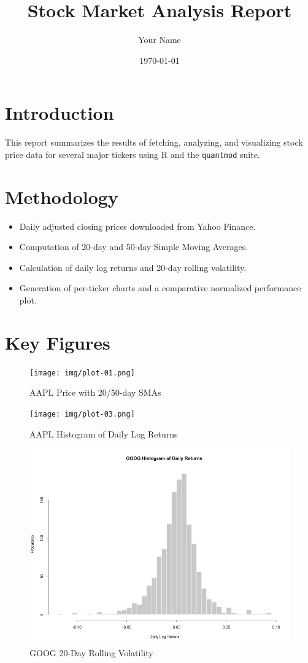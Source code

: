 \documentclass[11pt]{article}
\title{Stock Market Analysis Report}
\author{Your Name}
\date{\today}
\begin{document}
\maketitle
\tableofcontents
\newpage

\section{Introduction}
This report summarizes the results of fetching, analyzing, and visualizing stock price data 
for several major tickers using R and the \texttt{quantmod} suite.  

\section{Methodology}
\begin{itemize}
  \item Daily adjusted closing prices downloaded from Yahoo Finance.
  \item Computation of 20-day and 50-day Simple Moving Averages.
  \item Calculation of daily log returns and 20-day rolling volatility.
  \item Generation of per-ticker charts and a comparative normalized performance plot.
\end{itemize}

\section{Key Figures}

\begin{figure}[H]
  \centering
  \texttt{[image: img/plot-01.png]}
  \caption{AAPL Price with 20/50-day SMAs}
\end{figure}

\begin{figure}[H]
  \centering
  \texttt{[image: img/plot-03.png]}
  \caption{AAPL Histogram of Daily Log Returns}
\end{figure}

\begin{figure}[H]
  \centering
  \includegraphics[width=\textwidth]{img/plot-15.png}
  \caption{GOOG 20-Day Rolling Volatility}
\end{figure}
\end{document}

